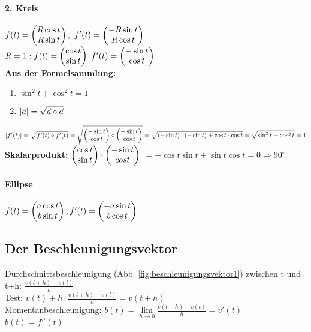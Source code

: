 \paragraph{2. Kreis} 
$ f(t) =  \begin{pmatrix}  R \cos t\\ R\sin t \end{pmatrix} , $
$f'(t) =  \begin{pmatrix}  - R \sin t\\ R \cos t \end{pmatrix} $\\
$R=1: f(t) =  \begin{pmatrix}  \cos t \\ \sin t \end{pmatrix}  $
$f'(t) =  \begin{pmatrix}  - \sin t \\ \cos t \end{pmatrix} $ \\

\textbf{Aus der Formelsammlung: }
\begin{enumerate}
\item $\sin^2 t + \cos^2 t =1$ 
\item $ \left\vert \vec{a} \right\vert  = \sqrt{\vec{a} \circ \vec{a}}$
\end{enumerate}

$  \left\vert f'(t) \right\vert  
= \sqrt{f'(t) \circ f'(t)}
= \sqrt{ \begin{pmatrix}  - \sin t \\ \cos t  \end{pmatrix}  \circ  \begin{pmatrix}  - \sin t\\ \cos t \end{pmatrix} }
= \sqrt{ (-\sin t) \cdot (-\sin t) + \cos t \cdot \cos t }
= \sqrt{\sin^2 t + \cos^2 t }=1 
$\\

\textbf{Skalarprodukt: }
$ \begin{pmatrix}  \cos t\\\sin t \end{pmatrix}  \cdot  \begin{pmatrix}  -\sin t\\ cos t \end{pmatrix}  $
$= -\cos t \sin t + \sin t \cos t = 0 \Rightarrow 90^\circ $.

\paragraph{Ellipse}
$ f(t)= \begin{pmatrix}  a \cos t\\ b \sin t  \end{pmatrix} , f'(t)= \begin{pmatrix}  -a \sin t\\ b \cos t \end{pmatrix} $

\subsection{Der Beschleunigungsvektor}
Durchschnittsbeschleunigung (Abb. \ref{fig:beschleunigungsvektor1}) zwischen t und t+h: 
$ \frac{v(t+h)-v(t)}{h}$\\
Test: $ v(t)+ h\cdot \frac{v(t+h)-v(t)}{h} = v(t+h)$\\
Momentanbeschleunigung: 
$ b(t)=\lim\limits_{h\rightarrow 0} \frac{v(t+h)-v(t)}{h} = v'(t)$\\
$ b(t)=f''(t)$

